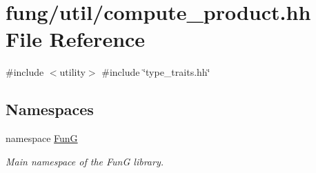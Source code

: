 \hypertarget{compute__product_8hh}{\section{fung/util/compute\-\_\-product.hh \-File \-Reference}
\label{compute__product_8hh}
}
{\ttfamily \#include $<$utility$>$}\*
{\ttfamily \#include \char`\"{}type\-\_\-traits.\-hh\char`\"{}}\*
\subsection*{\-Namespaces}
\begin{DoxyCompactItemize}
\item 
namespace \hyperlink{namespaceFunG}{\-Fun\-G}
\begin{DoxyCompactList}\small\item\em \-Main namespace of the \-Fun\-G library. \end{DoxyCompactList}\end{DoxyCompactItemize}
